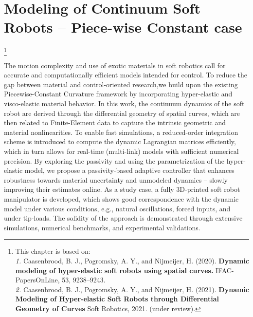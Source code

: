 \graphicspath{{2_Chapter/}}
\chapter{Modeling of Continuum Soft Robots -- Piece-wise Constant case}
{\let\thefootnote\relax\footnote{{\color{black}This chapter is based on: \\
\textit{1.} Caasenbrood, B. J., Pogromsky, A. Y., and Nijmeijer, H. (2020). \textbf{Dynamic modeling of hyper-elastic soft robots using spatial curves.} IFAC-PapersOnLine, 53, 9238–9243.\\[0.25em] \textit{2.} Caasenbrood, B. J., Pogromsky, A. Y., and Nijmeijer, H. (2021). \textbf{Dynamic Modeling of Hyper-elastic Soft Robots through Differential Geometry of Curves} Soft Robotics, 2021. (under review).
}}}
\label{chap:2}

\begin{chapter-abstract}
The motion complexity and use of exotic materials in soft robotics call for accurate and computationally efficient models intended for control. To reduce the gap between material and control-oriented research,we build upon the existing Piecewise-Constant Curvature framework by incorporating hyper-elastic and visco-elastic material behavior. In this work, the continuum dynamics of the soft robot are derived through the differential geometry of spatial curves, which are then related to Finite-Element data to capture the intrinsic geometric and material nonlinearities. To enable fast simulations, a reduced-order integration scheme is introduced to compute the dynamic Lagrangian matrices efficiently, which in turn allows for real-time (multi-link) models with sufficient numerical precision. By exploring the passivity and using the parametrization of the hyper-elastic model, we propose a passivity-based adaptive controller that enhances robustness towards material uncertainty and unmodeled dynamics -- slowly improving their estimates online. As a study case, a fully 3D-printed soft robot manipulator is developed, which shows good correspondence with the dynamic model under various conditions, e.g., natural oscillations, forced inputs, and under tip-loads. The solidity of the approach is demonstrated through extensive simulations, numerical benchmarks, and experimental validations.
\end{chapter-abstract}

\clearpage
\Materialtrue %
%


\clearpage


\clearpage


\clearpage

%
%
%
%

